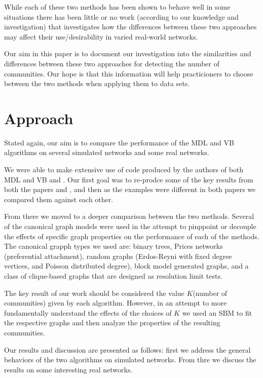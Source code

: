 \documentclass[twocolumn,twoside]{IEEEtran}
\begin{document}
While each of these two methods has been shown to behave well in some situations there has been little or no work (according to our knowledge and investigation) that investigates how the differences between these two approaches may affect their use/desirability in varied real-world networks.

Our aim in this paper is to document our investigation into the similarities and differences between these two approaches for detecting the number of communities. Our hope is that this information will help practicioners to choose between the two methods when applying them to data sets.

\section*{Approach}\label{sec:Approach}
Stated again, our aim is to compare the performance of the MDL and VB algorithms on several simulated networks and some real networks.

We were able to make extensive use of code produced by the authors of both MDL and VB \cite{peixoto_graph-tool_2014} and \cite{Hofman_python_2008}. Our first goal was to re-prodce some of the key results from both the papers \cite{Peixoto2013} and \cite{Hofman2008}, and then as the examples were different in both papers we compared them against each other.

From there we moved to a deeper comparison between the two methods. Several of the canonical graph models were used in the attempt to pinppoint or decouple the effects of specific graph properties on the performance of each of the methods. The canonical grapph types we used are: binary trees, Prices networks (preferential attachment), random graphs (Erdos-Reyni with fixed degree vertices, and Poisson distributed degree), block model generated graphs, and a class of clique-based graphs that are
designed as resolution limit tests.

The key result of our work should be considered the value $K$(number of communities) given by each algorithm. However, in an attempt to more fundamentally understand the effects of the choices of $K$ we used an SBM to fit the respective graphs and then analyze the properties of the resulting communities.

Our results and discussion are presented as follows: first we address the general behaviors of the two algorithms on simulated networks. From thre we discuss the results on some interesting real networks.
\end{document}
